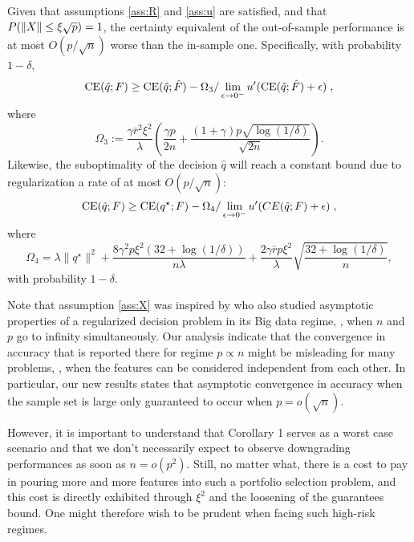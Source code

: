 \begin{coro}\label{coro:outsampleBoundBigData}
  Given that assumptions \ref{ass:R} and \ref{ass:u} are satisfied, and that
  $P(\|X\|\leq \xi\sqrt{p})=1$, the certainty equivalent of the out-of-sample
  performance is at most $O(p/\sqrt{n})$ worse than the in-sample one. Specifically, with
  probability $1-\delta$,
  \[
    \operatorname{CE}({\hat{q}};F) \geq \operatorname{CE}({\hat{q}};{\hat{F}}) - \Omega_3/
    \lim_{\epsilon\to0^-}u'(\operatorname{CE}({\hat{q}};{\hat{F}})+\epsilon)\;,
  \]
  where
  \[
    \Omega_3 := \frac{\gamma\bar{r}^2\xi^2}{\lambda} \left(\frac{\gamma p}{2n} +
      \frac{(1+\gamma)p\sqrt{\log(1/\delta)}}{\sqrt{2n}}\right).
  \]
  Likewise, the suboptimality of the decision $\hat q$ will reach a constant bound due to
  regularization a rate of at most $O(p/\sqrt{n})$:
  \[
    \operatorname{CE}(\hat q;F) \geq \operatorname{CE}(q^\star;F) - \Omega_4/\lim_{\epsilon\to0^{-}}u'(CE(\hat q;F)+\epsilon)\;,
  \]
  where
  \[
    \Omega_4 = \lambda\|q^\star\|^2 +\frac{8\gamma^2p\xi^2(32+\log(1/\delta))}{n\lambda}
    +\frac{2\gamma\bar rp\xi^2}{\lambda}\sqrt{\frac{32+\log(1/\delta)}{n}},
  \]
  with probability $1-\delta$.
\end{coro}

Note that assumption \ref{ass:X} was inspired by \cite{rudin2015big} who also studied
asymptotic properties of a regularized decision problem in its Big data regime, \ie, when
$n$ and $p$ go to infinity simultaneously. Our analysis indicate that the convergence in
accuracy that is reported there for regime $p\propto n$ might be misleading for many
problems, \eg, when the features can be considered independent from each other.  In
particular, our new results states that asymptotic convergence in accuracy when the sample
set is large only guaranteed to occur when $p=o(\sqrt{n})$. 

However, it is important to understand that Corollary 1 serves as a worst case scenario
and that we don't necessarily expect to observe downgrading performances as soon as
$n=o(p^2)$. Still, no matter what, there is a cost to pay in pouring more and more
features into such a portfolio selection problem, and this cost is directly exhibited
through $\xi^2$ and the loosening of the guarantees bound. One might therefore wish to be
prudent when facing such high-risk regimes.



